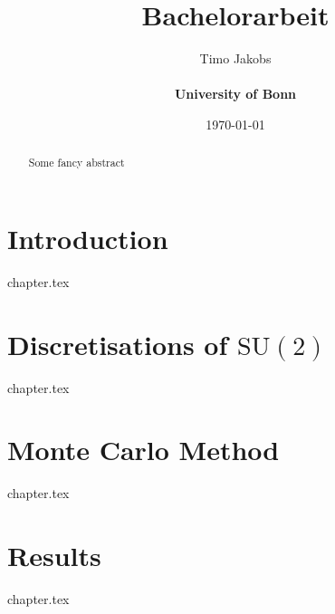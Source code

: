 \documentclass[a4paper]{scrartcl}
\title{Bachelorarbeit}
\author{Timo Jakobs \\\\ \textbf{University of Bonn}}
\date{\today}
\begin{document}
\maketitle

\begin{abstract}
Some fancy abstract
\end{abstract}

\tableofcontents
\newpage

\newcommand{\SUTwo}{$\mathrm{SU}(2)$ }


\section{Introduction}
{chapter.tex}

\section{Discretisations of \SUTwo}
{chapter.tex}

\newpage
\section{Monte Carlo Method}
{chapter.tex}

\section{Results}
{chapter.tex}

\printbibliography

\begin{appendix}

\end{appendix}
\end{document}
